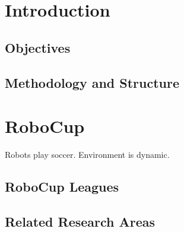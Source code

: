 \newpage

\listoftables
{}
\newpage


\listoflistings
{}
\newpage

\renewcommand{\thepage}{\arabic{page}}

\setcounter{page}{1} 


\section{Introduction}
\label{sec:introduction}




\subsection{Objectives}
\label{sec:objectives}



\subsection{Methodology and Structure}
\label{sec:methodology}



\newpage
\section{RoboCup}
Robots play soccer.
Environment is dynamic.

\subsection{RoboCup Leagues}

\subsection{Related Research Areas}




